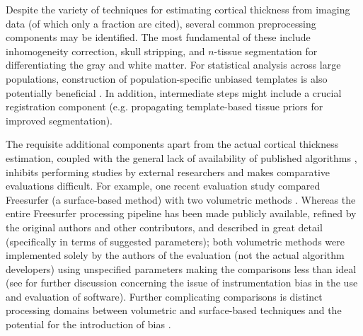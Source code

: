 Despite the variety of techniques for estimating cortical thickness
from imaging data (of which
only a fraction are cited), several common preprocessing components
may be identified.
The most fundamental of these include inhomogeneity correction, skull stripping, and $n$-tissue segmentation 
for differentiating the gray and white matter.  For statistical analysis 
across large populations, construction of population-specific unbiased templates
is also potentially beneficial \citep{evans2012}.
In addition, intermediate steps might include a crucial registration component (e.g. 
propagating template-based tissue priors for improved segmentation).

  The requisite
additional components apart from the actual cortical thickness estimation, 
coupled with the general lack of availability of published
algorithms \citep{kovacevic2006}, inhibits performing studies by external researchers 
and makes comparative evaluations difficult.  For example, one recent evaluation 
study \citep{clarkson2011} compared
Freesurfer (a surface-based method) with two volumetric methods \citep{jones2000,das2009}.
Whereas the entire Freesurfer processing pipeline has been made publicly available, 
refined by the original authors and other contributors, and described in great detail 
(specifically in terms of suggested parameters); both volumetric methods were 
implemented solely by the authors of the evaluation (not the actual algorithm developers) using 
unspecified parameters making the comparisons less than
ideal (see \cite{tustison2013} for further discussion concerning the issue of instrumentation bias in
the use and evaluation of software). Further complicating comparisons is distinct processing domains between
volumetric and surface-based techniques and the potential for the introduction
of bias \citep{klein2010}.

